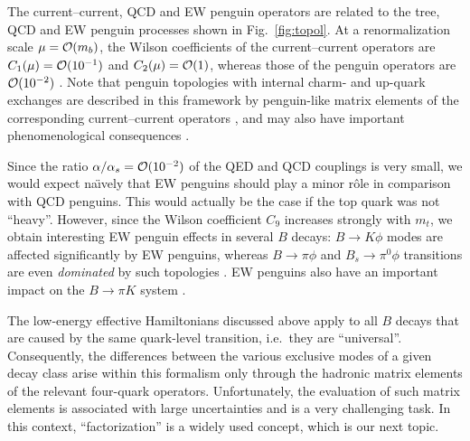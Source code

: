 \documentclass[12pt]{article}
\begin{document}
The current--current, QCD and EW penguin operators are related to the tree, 
QCD and EW penguin processes shown in 
Fig.~\ref{fig:topol}. At a renormalization scale
$\mu={\cal O}(m_b)$, the Wilson coefficients of the current--current operators
are $C_1(\mu)={\cal O}(10^{-1})$ and $C_2(\mu)={\cal O}(1)$, whereas those
of the penguin operators are ${\cal O}(10^{-2})$ \cite{B-LH98,BBL-rev}. 
Note that penguin 
topologies with internal charm- and up-quark exchanges \cite{BSS}
are described in this framework by penguin-like matrix elements of 
the corresponding current--current operators \cite{RF-DIPL}, and 
may also have important phenomenological consequences \cite{BF-PEN,CHARM-PEN}.

Since the ratio $\alpha/\alpha_s={\cal O}(10^{-2})$ of the QED and QCD 
couplings is very small, we would expect na\"\i vely that EW penguins 
should play a minor r\^ole in comparison with QCD penguins. This would 
actually be the case if the top quark was not ``heavy''. However, since 
the Wilson coefficient $C_9$ increases strongly with $m_t$, we obtain 
interesting EW penguin effects in several $B$ decays: $B\to K\phi$ 
modes are affected significantly by EW penguins, whereas $B\to\pi\phi$ 
and $B_s\to\pi^0\phi$ transitions are even {\it dominated} by such 
topologies \cite{RF-EWP,RF-rev}. EW penguins also have an important 
impact on the $B\to\pi K$ system \cite{EWP-BpiK}.

The low-energy effective Hamiltonians discussed above apply to all 
$B$ decays that are caused by the same quark-level transition, i.e.\ 
they are ``universal''. Consequently, the differences between the 
various exclusive modes of a given decay class arise within this formalism 
only through the hadronic matrix elements of the relevant four-quark 
operators. Unfortunately, the evaluation of such matrix elements is 
associated with large uncertainties and is a very challenging task. In this 
context, ``factorization'' is a widely used concept, which is our next 
topic.


%
%
%
\end{document}
